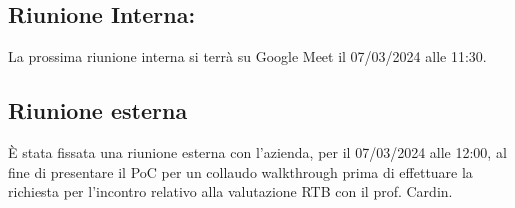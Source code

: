\documentclass{article}
\begin{document}
\subsection{Riunione Interna:}
La prossima riunione interna si terrà su Google Meet il 07/03/2024 alle 11:30.
\subsection{Riunione esterna}
È stata fissata una riunione esterna con l'azienda, per il 07/03/2024 alle 12:00, al fine di presentare il PoC per un collaudo walkthrough prima di effettuare la richiesta per l'incontro relativo alla valutazione RTB con il prof. Cardin. 
\end{document}
